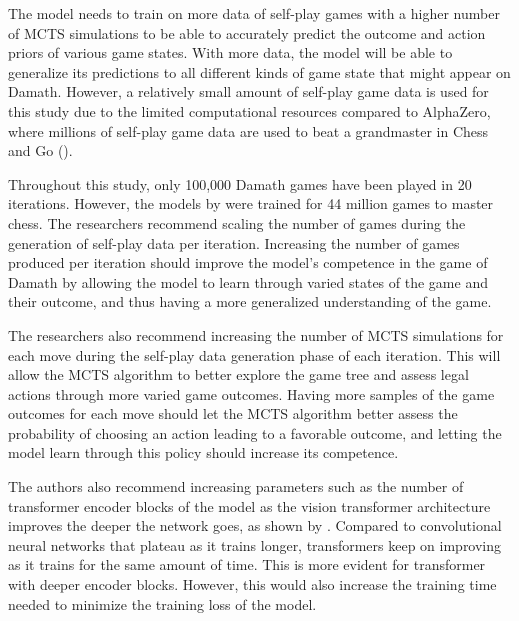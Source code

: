 The model needs to train on more data of self-play games with a higher number of MCTS simulations to be able to accurately predict the outcome and action priors of various game states. With more data, the model will be able to generalize its predictions to all different kinds of game state that might appear on Damath. However, a relatively small amount of self-play game data is used for this study due to the limited computational resources compared to AlphaZero, where millions of self-play game data are used to beat a grandmaster in Chess and Go (\cite{silver2017masteringchessshogiselfplay}).


Throughout this study, only 100,000 Damath games have been played in 20 iterations. However, the models by \cite{silver2017masteringchessshogiselfplay} were trained for 44 million games to master chess. The researchers recommend scaling the number of games during the generation of self-play data per iteration. Increasing the number of games produced per iteration should improve the model's competence in the game of Damath by allowing the model to learn through varied states of the game and their outcome, and thus having a more generalized understanding of the game.

The researchers also recommend increasing the number of MCTS simulations for each move during the self-play data generation phase of each iteration. This will allow the MCTS algorithm to better explore the game tree and assess legal actions through more varied game outcomes. Having more samples of the game outcomes for each move should let the MCTS algorithm better assess the probability of choosing an action leading to a favorable outcome, and letting the model learn through this policy should increase its competence.

The authors also recommend increasing parameters such as the number of transformer encoder blocks of the model as the vision transformer architecture improves the deeper the network goes, as shown by \cite{dosovitskiy2021imageworth16x16words}. Compared to convolutional neural networks that plateau as it trains longer, transformers keep on improving as it trains for the same amount of time. This is more evident for transformer with deeper encoder blocks. However, this would also increase the training time needed to minimize the training loss of the model.

